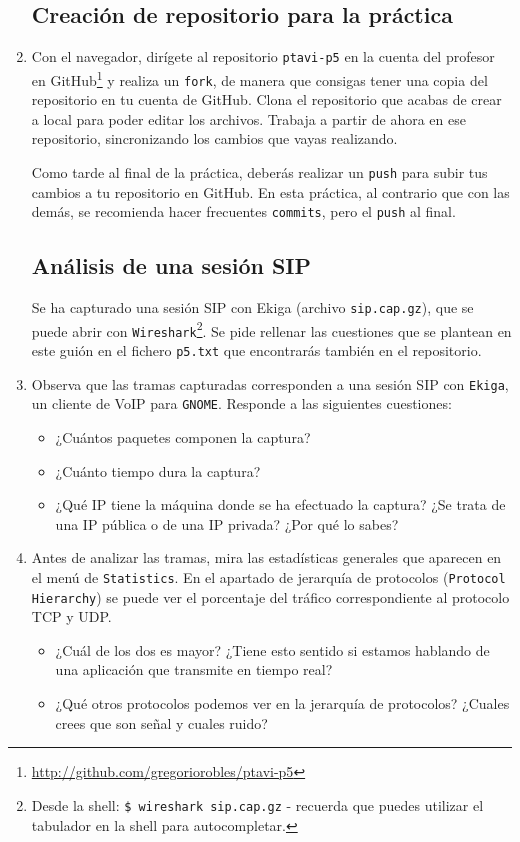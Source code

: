 \documentclass[11pt,a4paper]{article}
\begin{document}
\begin{enumerate}

\subsection*{Creación de repositorio para la práctica}

  \item Con el navegador, dirígete al repositorio \texttt{ptavi-p5} en la cuenta del profesor en GitHub\footnote{\url{http://github.com/gregoriorobles/ptavi-p5}} y realiza un \texttt{fork}, de manera que consigas tener una copia del repositorio en tu cuenta de GitHub. Clona el repositorio que acabas de crear a local para poder editar los archivos. Trabaja a partir de ahora en ese repositorio, sincronizando los cambios que vayas realizando.

  Como tarde al final de la práctica, deberás realizar un \texttt{push} para subir tus cambios a tu repositorio en GitHub. En esta práctica, al contrario que con las demás, se recomienda hacer frecuentes \texttt{commits}, pero el \texttt{push} al final.


\subsection*{Análisis de una sesión SIP}

Se ha capturado una sesión SIP con Ekiga (archivo \texttt{sip.cap.gz}), que se puede abrir con \texttt{Wireshark}\footnote{Desde la shell: \texttt{\$ wireshark sip.cap.gz} - recuerda que puedes utilizar el tabulador en la shell para autocompletar.}. Se pide rellenar las cuestiones que se plantean en este guión en el fichero \texttt{p5.txt} que encontrarás también en el repositorio. 

  \item Observa que las tramas capturadas corresponden a una sesión SIP con \texttt{Ekiga}, un cliente de VoIP para \texttt{GNOME}. Responde a las siguientes cuestiones:
  \begin{itemize}
    \item ¿Cuántos paquetes componen la captura?
    \item ¿Cuánto tiempo dura la captura?
    \item ¿Qué IP tiene la máquina donde se ha efectuado la captura? ¿Se trata de una IP pública o de una IP privada? ¿Por qué lo sabes?
  \end{itemize}

  \item Antes de analizar las tramas, mira las estadísticas generales que aparecen en el menú de \texttt{Statistics}. En el apartado de jerarquía de protocolos (\texttt{Protocol Hierarchy}) se puede ver el porcentaje del tráfico correspondiente al protocolo TCP y UDP.
  \begin{itemize}
    \item ¿Cuál de los dos es mayor? ¿Tiene esto sentido si estamos hablando de una aplicación que transmite en tiempo real? 
    \item ¿Qué otros protocolos podemos ver en la jerarquía de protocolos? ¿Cuales crees que son señal y cuales ruido?
  \end{itemize}


\end{enumerate}
\end{document}
